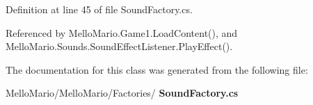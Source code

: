 Definition at line 45 of file Sound\+Factory.\+cs.



Referenced by Mello\+Mario.\+Game1.\+Load\+Content(), and Mello\+Mario.\+Sounds.\+Sound\+Effect\+Listener.\+Play\+Effect().



The documentation for this class was generated from the following file\+:\begin{DoxyCompactItemize}
\item 
Mello\+Mario/\+Mello\+Mario/\+Factories/\textbf{ Sound\+Factory.\+cs}\end{DoxyCompactItemize}
